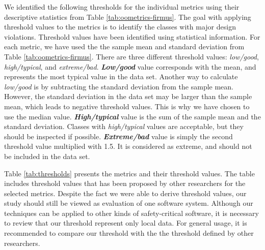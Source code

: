 We identified the following thresholds for the individual metrics using their descriptive statistics from Table \ref{tab:oometrics-firmus}. The goal with applying threshold values to the metrics is to identify the classes with major design violations. Threshold values have been identified using statistical information\cite{lanza2007object}. For each metric, we have used the the sample mean and standard deviation from Table \ref{tab:oometrics-firmus}. There are three different threshold values: \textit{low/good}, \textit{high/typical}, and \textit{extreme/bad}. \textbf{\textit{Low/good}} value corresponds with the mean, and represents the most typical value in the data set\cite{cais2014identifying}. Another way to calculate \textit{low/good} is by subtracting the standard deviation from the sample mean\cite{lanza2007object}. However, the standard deviation in the data set may be larger than the sample mean, which leads to negative threshold values. This is why we have chosen to use the median value. \textbf{\textit{High/typical}} value is the sum of the sample mean and the standard deviation. Classes with \textit{high/typical} values are acceptable, but they should be inspected if possible. \textbf{\textit{Extreme/bad}} value is simply the second threshold value multiplied with 1.5\cite{lanza2007object}. It is considered as extreme, and should not be included in the data set. 


Table \ref{tab:thresholds} presents the metrics and their threshold values. The table includes threshold values that has been proposed by other researchers for the selected metrics. Despite the fact we were able to derive threshold values, our study should still be viewed as evaluation of one software system. Although our techniques can be applied to other kinds of safety-critical software, it is necessary to review that our threshold represent only local data. For general usage, it is recommended to compare our threshold with the the threshold defined by other researchers.


